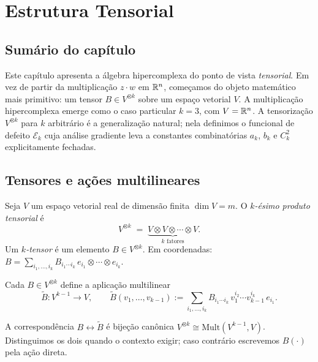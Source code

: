 \documentclass[tensorial.tex]{subfiles}
\begin{document}
\chapter{Estrutura Tensorial}\label{cap:tensorial}

\section*{Sumário do capítulo}

Este capítulo apresenta a álgebra hipercomplexa do ponto de vista
\emph{tensorial}. Em vez de partir da multiplicação $z \cdot w$ em $\mathbb{R}^n$,
começamos do objeto matemático mais primitivo: um tensor
$B \in V^{\otimes k}$ sobre um espaço vetorial $V$. A multiplicação
hipercomplexa emerge como o caso particular $k = 3$, com $V = \mathbb{R}^n$.
A tensorização $V^{\otimes k}$ para $k$ arbitrário é a generalização
natural; nela definimos o funcional de defeito
$\mathcal{E}_k$ cuja análise gradiente leva a constantes
combinatórias $a_k$, $b_k$ e $C_k^2$ explicitamente fechadas.

\section{Tensores e ações multilineares}\label{sec:tensor}

\begin{definicao}
Seja $V$ um espaço vetorial real de dimensão finita $\dim V = m$.
O \emph{$k$-ésimo produto tensorial} é
\[
  V^{\otimes k} \;=\; \underbrace{V \otimes V \otimes \cdots \otimes V}_{k \text{ fatores}}.
\]
Um \emph{$k$-tensor} é um elemento $B \in V^{\otimes k}$. Em coordenadas:
$B = \sum_{i_1, \ldots, i_k} B_{i_1 \cdots i_k}\, e_{i_1} \otimes \cdots \otimes e_{i_k}$.
\end{definicao}

\begin{definicao}
Cada $B \in V^{\otimes k}$ define a aplicação multilinear
\begin{equation}\label{eq:acao-multilinear}
  \widetilde{B} : V^{k-1} \to V,
  \qquad \widetilde{B}(v_1, \ldots, v_{k-1}) := \sum_{i_1, \ldots, i_k} B_{i_1 \cdots i_k}\, v_1^{i_2} \cdots v_{k-1}^{i_k}\, e_{i_1}.
\end{equation}
\end{definicao}

\begin{observacao}
A correspondência $B \leftrightarrow \widetilde{B}$ é bijeção canônica
$V^{\otimes k} \cong \mathrm{Mult}(V^{k-1}, V)$. Distinguimos os dois
quando o contexto exigir; caso contrário escrevemos $B(\cdot)$ pela
ação direta.
\end{observacao}
\end{document}

